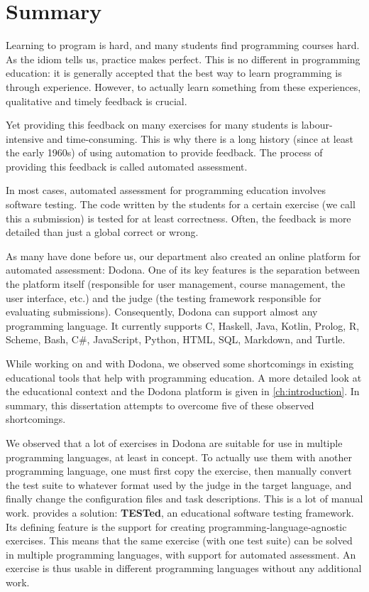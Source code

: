 \documentclass[main]{subfiles}
\begin{document}
\chapter{Summary}\label{ch:summary}

Learning to program is hard, and many students find programming courses hard.
As the idiom tells us, practice makes perfect.
This is no different in programming education: it is generally accepted that the best way to learn programming is through experience.
However, to actually learn something from these experiences, qualitative and timely feedback is crucial.

Yet providing this feedback on many exercises for many students is labour-intensive and time-consuming.
This is why there is a long history (since at least the early 1960s) of using automation to provide feedback.
The process of providing this feedback is called automated assessment.

In most cases, automated assessment for programming education involves software testing.
The code written by the students for a certain exercise (we call this a submission) is tested for at least correctness.
Often, the feedback is more detailed than just a global correct or wrong.

As many have done before us, our department also created an online platform for automated assessment: Dodona.
One of its key features is the separation between the platform itself (responsible for user management, course management, the user interface, etc.) and the judge (the testing framework responsible for evaluating submissions).
Consequently, Dodona can support almost any programming language.
It currently supports C, Haskell, Java, Kotlin, Prolog, R, Scheme, Bash, C\#, JavaScript, Python, HTML, SQL, Markdown, and Turtle.

While working on and with Dodona, we observed some shortcomings in existing educational tools that help with programming education.
A more detailed look at the educational context and the Dodona platform is given in \cref{ch:introduction}.
In summary, this dissertation attempts to overcome five of these observed shortcomings.

We observed that a lot of exercises in Dodona are suitable for use in multiple programming languages, at least in concept.
To actually use them with another programming language, one must first copy the exercise, then manually convert the test suite to whatever format used by the judge in the target language, and finally change the configuration files and task descriptions.
This is a lot of manual work.
 provides a solution: \textbf{TESTed}, an educational software testing framework.
Its defining feature is the support for creating programming‐language‐agnostic exercises.
This means that the same exercise (with one test suite) can be solved in multiple programming languages, with support for automated assessment.
An exercise is thus usable in different programming languages without any additional work.
\end{document}

